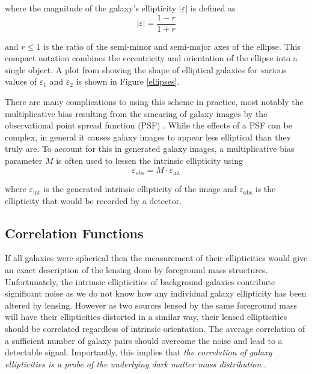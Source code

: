 \documentclass[%
 reprint,
 amsmath,amssymb,
 aps,nofootinbib
]{revtex4-1}
\begin{document}
\noindent where the magnitude of the galaxy's ellipticity $|\varepsilon|$ is defined as
\begin{equation}
|\varepsilon|=\frac{1-r}{1+r}
\end{equation}

\noindent and $r\leq1$ is the ratio of the semi-minor and semi-major axes of the ellipse. This compact notation combines the eccentricity and orientation of the ellipse into a single object. A plot from \cite{schneider} showing the shape of elliptical galaxies for various values of $\varepsilon_1$ and $\varepsilon_2$ is shown in Figure \ref{ellipses}.

There are many complications to using this scheme in practice, most notably the multiplicative bias resulting from the smearing of galaxy images by the observational point spread function (PSF) \cite{multiplicative_bias}. While the effects of a PSF can be complex, in general it causes galaxy images to appear less elliptical than they truly are. To account for this in generated galaxy images, a multiplicative bias parameter $M$ is often used to lessen the intrinsic ellipticity using
\begin{equation}\label{mult_bias}
\varepsilon_{\text{obs}}=M\cdot\varepsilon_{\text{int}}
\end{equation}

\noindent where $\varepsilon_{\text{int}}$ is the generated intrinsic ellipticity of the image and $\varepsilon_{\text{obs}}$ is the ellipticity that would be recorded by a detector.


\subsection{Correlation Functions} \label{corr_functions}

If all galaxies were spherical then the measurement of their ellipticities would give an exact description of the lensing done by foreground mass structures. Unfortunately, the intrinsic ellipticities of background galaxies contribute significant noise as we do not know how any individual galaxy ellipticity has been altered by lensing. However as two sources lensed by the same foreground mass will have their ellipticities distorted in a similar way, their lensed ellipticities should be correlated regardless of intrinsic orientation. The average correlation of a sufficient number of galaxy pairs should overcome the noise and lead to a detectable signal. Importantly, this implies that \textit{the correlation of galaxy ellipticities is a probe of the underlying dark matter mass distribution} \cite{??}.
\end{document}
